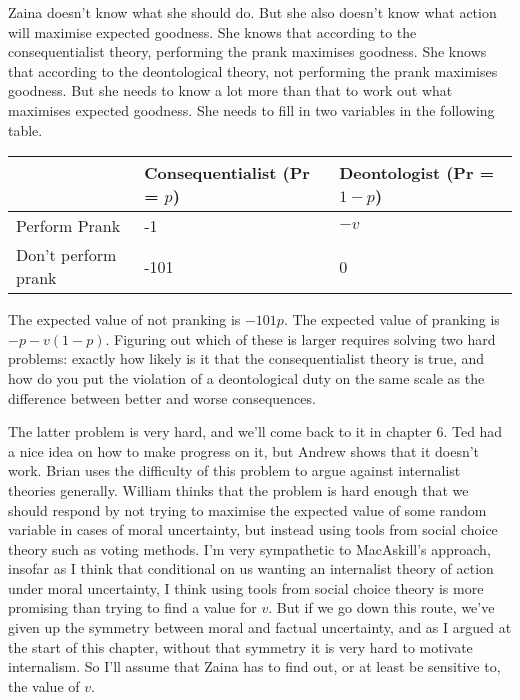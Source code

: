 \gls{Zaina} doesn't know what she should do. But she also doesn't know what action will maximise expected goodness. She knows that according to the consequentialist theory, performing the prank maximises goodness. She knows that according to the deontological theory, not performing the prank maximises goodness. But she needs to know a lot more than that to work out what maximises expected goodness. She needs to fill in two variables in the following table.

\begin{table}[htbp]
\begin{minipage}{\linewidth}
\setlength{\tymax}{0.5\linewidth}
\centering
\small
\begin{tabulary}{\textwidth}{@{}lll@{}} \toprule
 & Consequentialist (Pr = $p$) & Deontologist (Pr = $1-p$) \\
\midrule

 Perform Prank & -1 & $-v$ \\
 Don't perform prank & -101 & 0 \\
\bottomrule

\end{tabulary}
\end{minipage}
\end{table}

The expected value of not pranking is $-101p$. The expected value of pranking is $-p - v(1-p)$. Figuring out which of these is larger requires solving two hard problems: exactly how likely is it that the consequentialist theory is true, and how do you put the violation of a deontological duty on the same scale as the difference between better and worse consequences.

The latter problem is very hard, and we'll come back to it in chapter 6. Ted \citet{Lockhart2000} had a nice idea on how to make progress on it, but Andrew \citet{Sepielli2009} shows that it doesn't work. Brian \citet{Hedden2016} uses the difficulty of this problem to argue against internalist theories generally. William \citet{MacAskill2016} thinks that the problem is hard enough that we should respond by not trying to maximise the expected value of some random variable in cases of moral uncertainty, but instead using tools from social choice theory such as voting methods. I'm very sympathetic to MacAskill's approach, insofar as I think that conditional on us wanting an internalist theory of action under moral uncertainty, I think using tools from social choice theory is more promising than trying to find a value for $v$. But if we go down this route, we've given up the symmetry between moral and factual uncertainty, and as I argued at the start of this chapter, without that symmetry it is very hard to motivate internalism. So I'll assume that \gls{Zaina} has to find out, or at least be sensitive to, the value of $v$.

